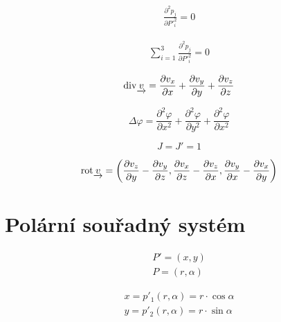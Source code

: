 \begin{equation}
\begin{split}
\frac{\partial^2 p_j}{\partial P'^2_i} = 0
\end{split}
\end{equation}

\begin{equation}
\begin{split}
\sum_{i=1}^3 \frac{\partial^2 p_j}{\partial P'^2_i} = 0
\end{split}
\end{equation}

\begin{equation}
\label{eq:kartezsky_ss_div}
\mathrm{div}{\underrightarrow{v}} = \frac{\partial v_x}{\partial x} + \frac{\partial v_y}{\partial y} + \frac{\partial v_z}{\partial z}\end{equation}

\begin{equation}
\label{eq:kartezsky_ss_laplace}
\Delta \varphi = \frac{\partial^2 \varphi}{\partial x^2} + \frac{\partial^2 \varphi}{\partial y^2} + \frac{\partial^2 \varphi}{\partial x^2}\end{equation}

\begin{equation}
\label{eq:kartezsky_ss_j}
J = J' = 1
\end{equation}

\begin{equation}
\label{eq:kartezsky_ss_rotace}
\mathrm{rot} \underrightarrow{v} = \left(\frac{\partial v_z}{\partial y} - \frac{\partial v_y}{\partial z}, \frac{\partial v_x}{\partial z} - \frac{\partial v_z}{\partial x}, \frac{\partial v_y}{\partial x} - \frac{\partial v_x}{\partial y} \right)
\end{equation}

\section{Polární souřadný systém}

\begin{equation}
\begin{split}
P' = (x, y) \\
P = (r, \alpha)
\end{split}
\end{equation}

\begin{equation}
\begin{split}
x = p'_1(r, \alpha) = r \cdot \cos \alpha \\
y = p'_2(r, \alpha) = r \cdot \sin \alpha
\end{split}
\end{equation}

